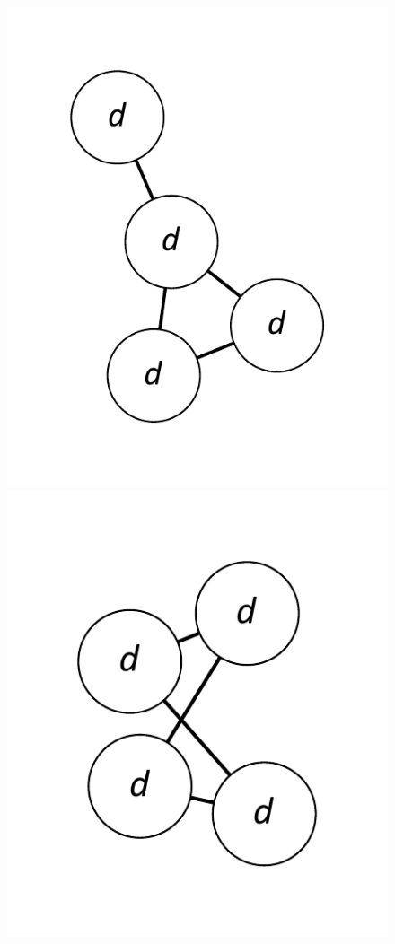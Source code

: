 \documentclass[12pt]{article}
\theoremstyle{plain}
\theoremstyle{definition}
\theoremstyle{remark}
\begin{document}
\begin{figure}[!htb]
\includegraphics[scale=0.25]{Superabundance/all/011011[2,1,2,3].pdf}
\includegraphics[scale=0.25]{Superabundance/all/011110[2,2,2,2].pdf}

\end{figure}
\end{document}
